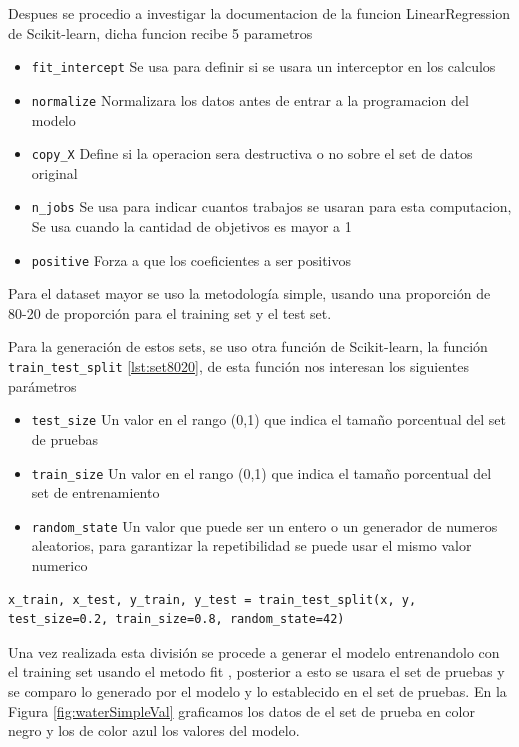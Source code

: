 \documentclass[sigconf]{acmart}
\begin{document}
	Despues se procedio a investigar la documentacion de la funcion LinearRegression de Scikit-learn, dicha funcion recibe 5 parametros
	
	\begin{itemize}
		\item \verb|fit_intercept| Se usa para definir si se usara un interceptor en los calculos
		\item \verb|normalize| Normalizara los datos antes de entrar a la programacion del modelo
		\item \verb|copy_X|  Define si la operacion sera destructiva o no sobre el set de datos original
		\item \verb|n_jobs| Se usa para indicar cuantos trabajos se usaran para esta computacion, Se usa cuando la cantidad de objetivos es mayor a 1
		\item \verb|positive| Forza a que los coeficientes a ser positivos
	\end{itemize}
	
	Para el dataset mayor se uso la metodología simple, usando una proporción de 80-20 de proporción para el training set y el test set.
	
	Para la generación de estos sets, se uso otra función de Scikit-learn, la función \verb|train_test_split| \ref{lst:set8020}, de esta función nos interesan los siguientes parámetros
	
	\begin{itemize}
		\item \verb|test_size| Un valor en el rango (0,1) que indica el tamaño porcentual del set de pruebas
		\item \verb|train_size| Un valor en el rango (0,1) que indica el tamaño porcentual del set de entrenamiento
		\item \verb|random_state| Un valor que puede ser un entero o un generador de numeros aleatorios, para garantizar la repetibilidad se puede usar el mismo valor numerico
	\end{itemize}
	
	\begin{lstlisting}[caption=Código de emplazo de los NA,breaklines,label=lst:set8020]
		x_train, x_test, y_train, y_test = train_test_split(x, y, test_size=0.2, train_size=0.8, random_state=42)
	\end{lstlisting}
	
	Una vez realizada esta división se procede a generar el modelo entrenandolo con el training set usando el metodo fit , posterior a esto se usara el set de pruebas y se comparo lo generado por el modelo y lo establecido en el set de pruebas. En la Figura \ref{fig:waterSimpleVal} graficamos los datos de el set de prueba en color negro y los de color azul los valores del modelo.
	
\end{document}
